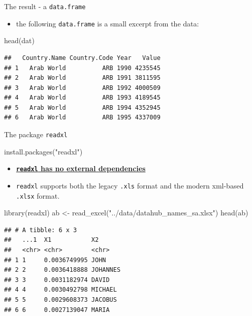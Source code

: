 \documentclass[
  10pt,
  ignorenonframetext,
]{beamer}
\newenvironment{Shaded}{\begin{snugshade}}{\end{snugshade}}
\newcommand{\KeywordTok}[1]{\textcolor[rgb]{0.94,0.87,0.69}{#1}}
\newcommand{\NormalTok}[1]{\textcolor[rgb]{0.80,0.80,0.80}{#1}}
\newcommand{\StringTok}[1]{\textcolor[rgb]{0.80,0.58,0.58}{#1}}
\providecommand{\tightlist}{%
  \setlength{\itemsep}{0pt}\setlength{\parskip}{0pt}}
\begin{document}
\begin{frame}[fragile]{The result - a \texttt{data.frame}}
\protect\hypertarget{the-result---a-data.frame}{}

\begin{itemize}
\tightlist
\item
  the following \texttt{data.frame} is a small excerpt from the data:
\end{itemize}

\begin{Shaded}
\begin{Highlighting}[]
\KeywordTok{head}\NormalTok{(dat)}
\end{Highlighting}
\end{Shaded}

\begin{verbatim}
##   Country.Name Country.Code Year   Value
## 1   Arab World          ARB 1990 4235545
## 2   Arab World          ARB 1991 3811595
## 3   Arab World          ARB 1992 4000509
## 4   Arab World          ARB 1993 4189545
## 5   Arab World          ARB 1994 4352945
## 6   Arab World          ARB 1995 4337009
\end{verbatim}

\end{frame}

\begin{frame}[fragile]{The package \texttt{readxl}}
\protect\hypertarget{the-package-readxl}{}

\begin{Shaded}
\begin{Highlighting}[]
\KeywordTok{install.packages}\NormalTok{(}\StringTok{"readxl"}\NormalTok{)}
\end{Highlighting}
\end{Shaded}

\begin{itemize}
\tightlist
\item
  \href{https://stackoverflow.com/questions/7049272/importing-excel-files-into-r-xlsx-or-xls}{\textbf{\texttt{readxl}
  has no external dependencies}}
\item
  \texttt{readxl} supports both the legacy \texttt{.xls} format and the
  modern xml-based \texttt{.xlsx} format.
\end{itemize}

\begin{Shaded}
\begin{Highlighting}[]
\KeywordTok{library}\NormalTok{(readxl)}
\NormalTok{ab <-}\StringTok{ }\KeywordTok{read_excel}\NormalTok{(}\StringTok{"../data/datahub_names_sa.xlsx"}\NormalTok{)}
\KeywordTok{head}\NormalTok{(ab)}
\end{Highlighting}
\end{Shaded}

\begin{verbatim}
## # A tibble: 6 x 3
##   ...1  X1           X2      
##   <chr> <chr>        <chr>   
## 1 1     0.0036749995 JOHN    
## 2 2     0.0036418888 JOHANNES
## 3 3     0.0031182974 DAVID   
## 4 4     0.0030492798 MICHAEL 
## 5 5     0.0029608373 JACOBUS 
## 6 6     0.0027139047 MARIA
\end{verbatim}

\end{frame}
\end{document}
